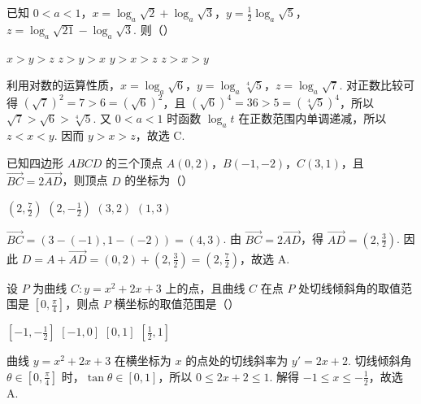 \begin{problem}
已知 \(0 < a < 1\)，\(x = \log_a\sqrt{2} + \log_a\sqrt{3}\)，\(y = \frac{1}{2}\log_a\sqrt{5}\)，\(z = \log_a\sqrt{21} - \log_a\sqrt{3}\). 则（\quad）

\choices
    {\(x > y > z\)}
    {\(z > y > x\)}
    {\(y > x > z\)}
    {\(z > x > y\)}

\begin{solution}
利用对数的运算性质，\(x=\log_a\sqrt{6}\)，\(y=\log_a\sqrt[4]{5}\)，\(z=\log_a\sqrt{7}\). 对正数比较可得
\((\sqrt{7})^2=7>6=(\sqrt{6})^2\)，且 \((\sqrt{6})^4=36>5=(\sqrt[4]{5})^4\)，所以
\(\sqrt{7}>\sqrt{6}>\sqrt[4]{5}\). 又 \(0<a<1\) 时函数 \(\log_a t\) 在正数范围内单调递减，所以 \(z<x<y\). 因而 \(y>x>z\)，故选 C.
\end{solution}
\end{problem}

\begin{problem}
已知四边形 \(ABCD\) 的三个顶点 \(A(0,2)\)，\(B(-1,-2)\)，\(C(3,1)\)，且 \(\overrightarrow{BC} = 2\overrightarrow{AD}\)，则顶点 \(D\) 的坐标为（\quad）

\choices
    {\( \left(2,\frac{7}{2}\right) \)}
    {\( \left(2,-\frac{1}{2}\right) \)}
    {\((3, 2)\)}
    {\((1,3)\)}

\begin{solution}
\(\overrightarrow{BC}=(3-(-1),1-(-2))=(4,3)\). 由 \(\overrightarrow{BC}=2\overrightarrow{AD}\)，得
\(\overrightarrow{AD}=\left(2,\frac{3}{2}\right)\). 因此
\(D=A+\overrightarrow{AD}=\left(0,2\right)+\left(2,\frac{3}{2}\right)=\left(2,\frac{7}{2}\right)\)，故选 A.
\end{solution}
\end{problem}

\begin{problem}
设 \(P\) 为曲线 \(C: y = x^{2} + 2x + 3\) 上的点，且曲线 \(C\) 在点 \(P\) 处切线倾斜角的取值范围是 \(\left[0, \frac{\pi}{4}\right]\)，则点 \(P\) 横坐标的取值范围是（\quad）

\choices
    {\(\left[-1, -\frac{1}{2}\right]\)}
    {\([-1, 0]\)}
    {\([0, 1]\)}
    {\(\left[\frac{1}{2}, 1\right]\)}

\begin{solution}
曲线 \(y=x^2+2x+3\) 在横坐标为 \(x\) 的点处的切线斜率为
\(y'=2x+2\). 切线倾斜角 \(\theta\in\left[0,\frac{\pi}{4}\right]\) 时，\(\tan\theta\in[0,1]\)，所以
\(0\leqslant2x+2\leqslant1\). 解得 \(-1\leqslant x\leqslant-\frac{1}{2}\)，故选 A.
\end{solution}
\end{problem}

